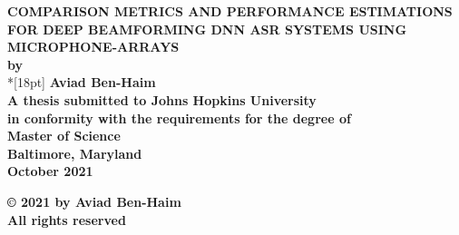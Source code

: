 \documentclass[12pt]{report}
\begin{document}
\newcommand{\bm}[1]{ \mbox{\boldmath $ #1 $} }
\newcommand{\bin}[2]{\left(\begin{array}{@{}c@{}} #1 \\ #2
  \end{array}\right) }
\renewcommand{\contentsname}{Table of Contents}
\baselineskip=24pt

\thispagestyle{empty}
\begin{center}
  \vspace*{.25in}
  {\bf\LARGE{ \MakeUppercase{Comparison metrics and performance
        estimations for deep beamforming DNN ASR systems
        using microphone-arrays }}}\\

  \vspace*{.75in}
  {\bf by} \\*[18pt]
  \vspace*{.2in}
  {\bf Aviad Ben-Haim}\\
  \vspace*{1in}
  {\bf A thesis submitted to Johns Hopkins University\\
    in conformity with the requirements for the degree of\\
    Master of Science }\\
  \vspace*{.65in}
  {\bf Baltimore, Maryland} \\
  {\bf October 2021} \\
  \vspace*{.45in}
  \begin{small}
    {\bf \copyright{ }2021 by Aviad Ben-Haim} \\
    {\bf All rights reserved}
  \end{small}
\end{center}
\newpage

\pagestyle{plain}
\setcounter{page}{2}





\pagestyle{plain}
\baselineskip=24pt
\tableofcontents

\listoftables
\listoffigures
\end{document}
